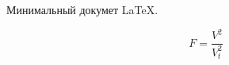 \documentclass{article}
\begin{document}
Минимальный докумет \LaTeX.

$$ F=\frac{V^2}{V^2_t} $$
\end{document}
